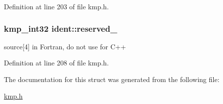 Definition at line 203 of file kmp.\-h.

\hypertarget{structident_ae29e80f6fc150f73c1790c8796bcfd9f}{
\subsubsection[{reserved\-\_\-3}]{\setlength{\rightskip}{0pt plus 5cm}kmp\-\_\-int32 ident\-::reserved\-\_}}\label{structident_ae29e80f6fc150f73c1790c8796bcfd9f}
source\mbox{[}4\mbox{]} in Fortran, do not use for C++ 

Definition at line 208 of file kmp.\-h.



The documentation for this struct was generated from the following file\-:\begin{DoxyCompactItemize}
\item 
\hyperlink{kmp_8h}{kmp.\-h}\end{DoxyCompactItemize}
